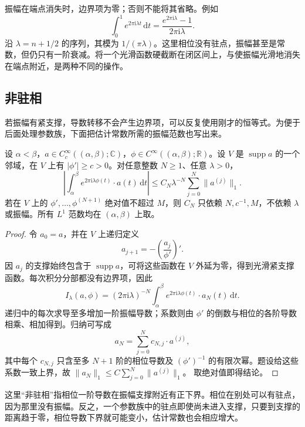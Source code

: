 振幅在端点消失时，边界项为零；否则不能将其省略。例如
\[
 \int_0^1e^{2\pi\mathrm i\lambda t}\,\mathrm dt
 =\frac{e^{2\pi\mathrm i\lambda}-1}{2\pi\mathrm i\lambda}.
\]
沿 \(\lambda=n+1/2\) 的序列，其模为 \(1/(\pi\lambda)\)。这里相位没有驻点，振幅甚至是常数，但仍只有一阶衰减。将一个光滑函数硬截断在闭区间上，与使振幅光滑地消失在端点附近，是两种不同的操作。

\subsection{非驻相}
\label{b2:subsec:210102}

若振幅有紧支撑，导数转移不会产生边界项，可以反复使用刚才的恒等式。为便于后面处理参数族，下面把估计常数所需的振幅范数也写出来。

\begin{proposition}[非驻相衰减]\label{b2:prop:21-nonstationary-one}
设 \(\alpha<\beta\)，\(a\in C_c^\infty((\alpha,\beta);\mathbb C)\)，\(\phi\in C^\infty((\alpha,\beta);\mathbb R)\)。设 \(V\) 是 \(\operatorname{supp}a\) 的一个邻域，在 \(V\) 上有 \(|\phi'|\geq c>0\)。对任意整数 \(N\geq1\)、任意 \(\lambda>0\)，
\[
 \left|\int_\alpha^\beta e^{2\pi\mathrm i\lambda\phi(t)}
                \cdot a(t)\,\mathrm dt\right|
 \leq C_N\lambda^{-N}\sum_{j=0}^N\|a^{(j)}\|_1.
\]
若在 \(V\) 上的 \(\phi',\ldots,\phi^{(N+1)}\) 绝对值不超过 \(M\)，则 \(C_N\) 只依赖 \(N,c^{-1},M\)，不依赖 \(\lambda\) 或振幅。所有 \(L^1\) 范数均在 \((\alpha,\beta)\) 上取。
\end{proposition}
\begin{proof}
令 \(a_0=a\)，并在 \(V\) 上递归定义
\[
 a_{j+1}=-\left(\frac{a_j}{\phi'}\right)'.
\]
因 \(a_j\) 的支撑始终包含于 \(\operatorname{supp}a\)，可将这些函数在 \(V\) 外延为零，得到光滑紧支撑函数。每次积分分部都没有边界项，因此
\[
 I_\lambda(a,\phi)
 =(2\pi\mathrm i\lambda)^{-N}
   \int_\alpha^\beta e^{2\pi\mathrm i\lambda\phi(t)}
          \cdot a_N(t)\,\mathrm dt.
\]
递归中的每次求导至多增加一阶振幅导数；系数则由 \(\phi'\) 的倒数与相位的各阶导数相乘、相加得到。归纳可写成
\[
 a_N=\sum_{j=0}^N c_{N,j}\cdot a^{(j)},
\]
其中每个 \(c_{N,j}\) 只含至多 \(N+1\) 阶的相位导数及 \((\phi')^{-1}\) 的有限次幂。题设给这些系数一致上界，故
\(\|a_N\|_1\leq C\sum_{j=0}^N\|a^{(j)}\|_1\)。
取绝对值即得结论。
\end{proof}

这里“非驻相”指相位一阶导数在振幅支撑附近有正下界。相位在别处可以有驻点，因为那里没有振幅。反之，一个参数族中的驻点即使尚未进入支撑，只要到支撑的距离趋于零，相位导数下界就可能变小，估计常数也会相应增大。

